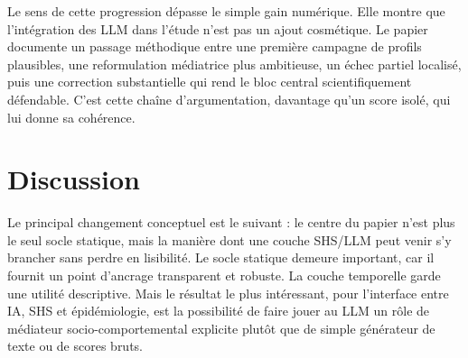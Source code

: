 \documentclass[ROIA,Unicode]{cedram}
\begin{document}
\begin{table}[ht]
    \centering
    \footnotesize
    \caption{Progression du bloc SHS/LLM entre les campagnes récentes. L'expérience exp008 sert surtout de diagnostic sur l'ancrage mobilité et n'est donc pas directement comparable sur la prévention.}
    \label{tab:llm-progression}
\end{table}

Le sens de cette progression dépasse le simple gain numérique. Elle montre que l'intégration des LLM dans l'étude n'est pas un ajout cosmétique. Le papier documente un passage méthodique entre une première campagne de profils plausibles, une reformulation médiatrice plus ambitieuse, un échec partiel localisé, puis une correction substantielle qui rend le bloc central scientifiquement défendable. C'est cette chaîne d'argumentation, davantage qu'un score isolé, qui lui donne sa cohérence.

\section{Discussion}
Le principal changement conceptuel est le suivant : le centre du papier n'est plus le seul socle statique, mais la manière dont une couche SHS/LLM peut venir s'y brancher sans perdre en lisibilité. Le socle statique demeure important, car il fournit un point d'ancrage transparent et robuste. La couche temporelle garde une utilité descriptive. Mais le résultat le plus intéressant, pour l'interface entre IA, SHS et épidémiologie, est la possibilité de faire jouer au LLM un rôle de médiateur socio-comportemental explicite plutôt que de simple générateur de texte ou de scores bruts.
\end{document}
